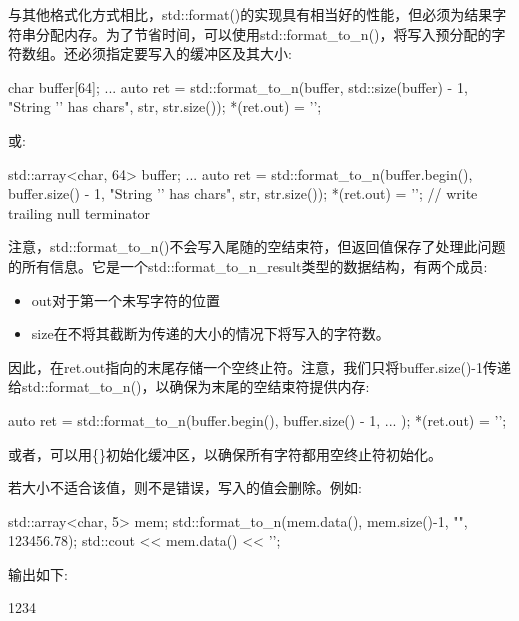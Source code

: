 
与其他格式化方式相比，std::format()的实现具有相当好的性能，但必须为结果字符串分配内存。为了节省时间，可以使用std::format\_to\_n()，将写入预分配的字符数组。还必须指定要写入的缓冲区及其大小:

\begin{cpp}
char buffer[64];
...
auto ret = std::format_to_n(buffer, std::size(buffer) - 1,
							"String '{}' has {} chars\n", str, str.size());
*(ret.out) = '\0';
\end{cpp}

或:

\begin{cpp}
std::array<char, 64> buffer;
...
auto ret = std::format_to_n(buffer.begin(), buffer.size() - 1,
							"String '{}' has {} chars\n", str, str.size());
*(ret.out) = '\0'; // write trailing null terminator
\end{cpp}

注意，std::format\_to\_n()不会写入尾随的空结束符，但返回值保存了处理此问题的所有信息。它是一个std::format\_to\_n\_result类型的数据结构，有两个成员:

\begin{itemize}
\item 
out对于第一个未写字符的位置

\item 
size在不将其截断为传递的大小的情况下将写入的字符数。
\end{itemize}

因此，在ret.out指向的末尾存储一个空终止符。注意，我们只将buffer.size()-1传递给std::format\_to\_n()，以确保为末尾的空结束符提供内存:

\begin{cpp}
auto ret = std::format_to_n(buffer.begin(), buffer.size() - 1, ... );
*(ret.out) = '\0';
\end{cpp}

或者，可以用\{\}初始化缓冲区，以确保所有字符都用空终止符初始化。

若大小不适合该值，则不是错误，写入的值会删除。例如:

\begin{cpp}
std::array<char, 5> mem{};
std::format_to_n(mem.data(), mem.size()-1, "{}", 123456.78);
std::cout << mem.data() << '\n';
\end{cpp}

输出如下:

\begin{shell}
1234
\end{shell}

